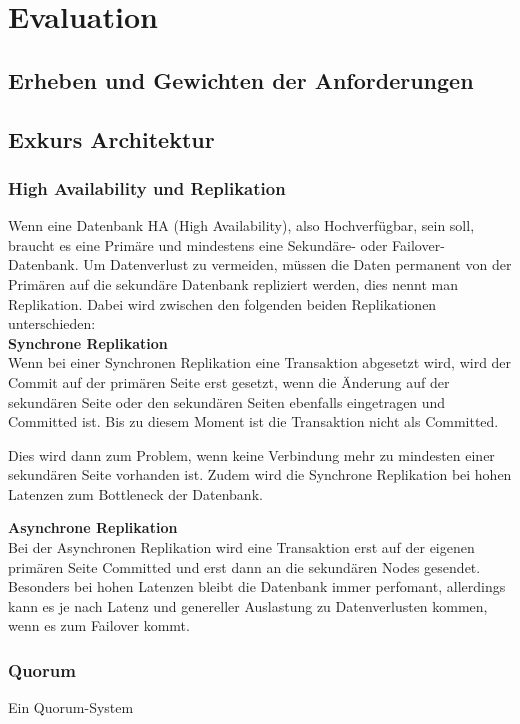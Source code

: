 
\section{Evaluation}
\subsection{Erheben und Gewichten der Anforderungen}
\subsection{Exkurs Architektur}
\subsubsection{High Availability und Replikation}
Wenn eine Datenbank HA (High Availability), also Hochverfügbar, sein soll, braucht es eine Primäre und mindestens eine Sekundäre- oder \Gls{Failover}-Datenbank.
Um Datenverlust zu vermeiden, müssen die Daten permanent von der Primären auf die sekundäre Datenbank repliziert werden, dies nennt man Replikation\cite{D9RDXENY}.
Dabei wird zwischen den folgenden beiden Replikationen unterschieden:
\\\textbf{Synchrone Replikation}\\
Wenn bei einer Synchronen Replikation eine Transaktion abgesetzt wird, wird der Commit auf der primären Seite erst gesetzt, wenn die Änderung auf der sekundären Seite oder den sekundären Seiten ebenfalls eingetragen und Committed ist.
Bis zu diesem Moment ist die Transaktion nicht als Committed.

Dies wird dann zum Problem, wenn keine Verbindung mehr zu mindesten einer sekundären Seite vorhanden ist.
Zudem wird die Synchrone Replikation bei hohen Latenzen zum Bottleneck der Datenbank.

\textbf{Asynchrone Replikation}\\
Bei der Asynchronen Replikation wird eine Transaktion erst auf der eigenen primären Seite Committed und erst dann an die sekundären Nodes gesendet.
Besonders bei hohen Latenzen bleibt die Datenbank immer perfomant, allerdings kann es je nach Latenz und genereller Auslastung zu Datenverlusten kommen, wenn es zum \Gls{Failover} kommt.
\subsubsection{Quorum}
\label{chap:Quorum}
Ein Quorum-System

